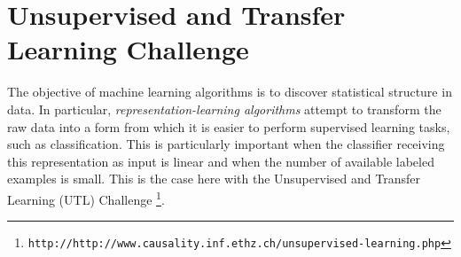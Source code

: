 \newcommand{\squeezeup}{\vspace{-2.5mm}}

\section{Unsupervised and Transfer Learning Challenge}
\label{utlc}


The objective of machine learning algorithms is to discover statistical structure
in data. In particular, {\em representation-learning algorithms} attempt to
transform the raw data into a form from which it is easier to perform
supervised learning tasks, such as classification. This is particularly important
when the classifier receiving this representation as input is linear
and when the number of available labeled examples is small. This is the
case here with the Unsupervised and Transfer Learning (UTL) Challenge
\footnote{\tt http://http://www.causality.inf.ethz.ch/unsupervised-learning.php}.

